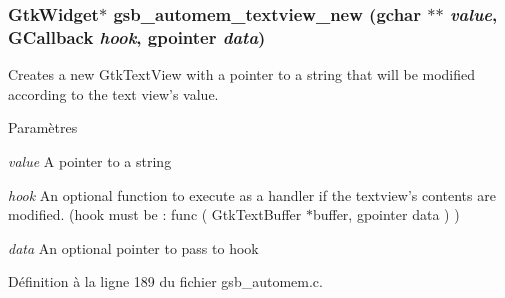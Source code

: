 \subsubsection[{gsb\_\-automem\_\-textview\_\-new}]{\setlength{\rightskip}{0pt plus 5cm}GtkWidget$\ast$ gsb\_\-automem\_\-textview\_\-new (gchar $\ast$$\ast$ {\em value}, \/  GCallback {\em hook}, \/  gpointer {\em data})}\label{gsb__automem_8h_ae241ad765946238b3a690c5ecea6c501}
Creates a new GtkTextView with a pointer to a string that will be modified according to the text view's value.


\begin{DoxyParams}{Paramètres}
\item[{\em value}]A pointer to a string \item[{\em hook}]An optional function to execute as a handler if the textview's contents are modified. (hook must be : func ( GtkTextBuffer $\ast$buffer, gpointer data ) ) \item[{\em data}]An optional pointer to pass to hook \end{DoxyParams}


Définition à la ligne 189 du fichier gsb\_\-automem.c.

